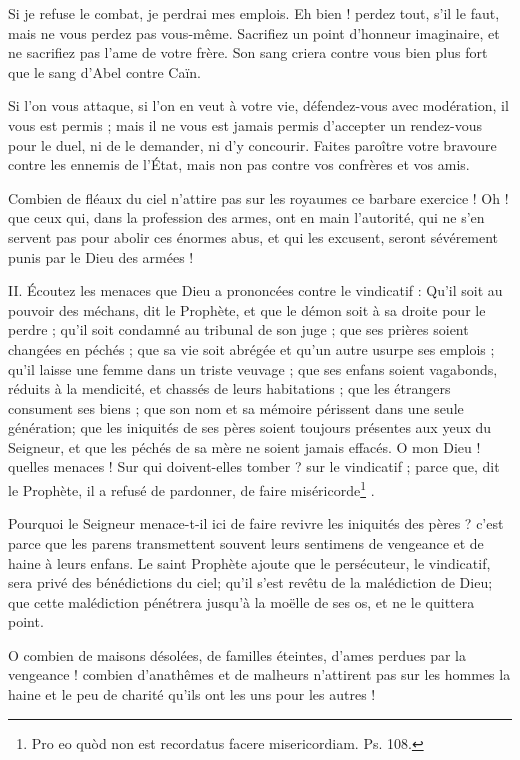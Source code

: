 \documentclass[instructions.tex]{subfiles}
\begin{document}
Si je refuse le combat, je perdrai mes emplois. Eh bien ! perdez tout, s’il le faut, mais ne vous perdez pas vous-même. Sacrifiez un point d’honneur imaginaire, et ne sacrifiez pas l’ame de votre frère. Son sang criera contre vous bien plus fort que le sang d’Abel contre Caïn.
 
Si l’on vous attaque, si l’on en veut à votre vie, défendez-vous avec modération, il vous est permis ; mais il ne vous est jamais permis d’accepter un rendez-vous pour le duel, ni de le demander, ni d’y concourir. Faites paroître votre bravoure contre les ennemis de l’État, mais non pas contre vos confrères et vos amis.
 
Combien de fléaux du ciel n’attire pas sur les royaumes ce barbare exercice ! Oh ! que ceux qui, dans la profession des armes, ont en main l’autorité, qui ne s’en servent pas pour abolir ces énormes abus, et qui les excusent, seront sévérement punis par le Dieu des armées !
 
II. Écoutez les menaces que Dieu a prononcées contre le vindicatif : Qu’il soit au pouvoir des méchans, dit le Prophète, et que le démon soit à sa droite pour le perdre ; qu’il soit condamné au tribunal de son juge ; que ses prières soient changées en péchés ; que sa vie soit abrégée et qu’un autre usurpe ses emplois ; qu’il laisse une femme dans un triste veuvage ; que ses enfans soient vagabonds, réduits à la mendicité, et chassés de leurs habitations ; que les étrangers consument ses biens ; que son nom et sa mémoire périssent dans une seule génération; que les iniquités de ses pères soient toujours présentes aux yeux du Seigneur, et que les péchés de sa mère ne soient jamais effacés. O mon Dieu ! quelles menaces ! Sur qui doivent-elles tomber ? sur le vindicatif ; parce que, dit le Prophète, il a refusé de pardonner, de faire miséricorde\footnote{Pro eo quòd non est recordatus facere misericordiam. Ps. 108.} .
 
Pourquoi le Seigneur menace-t-il ici de faire revivre les iniquités des pères ? c’est parce que les parens transmettent souvent leurs sentimens de vengeance et de haine à leurs enfans. Le saint Prophète ajoute que le persécuteur, le vindicatif, sera privé des bénédictions du ciel; qu’il s’est revêtu de la malédiction de Dieu; que cette malédiction pénétrera jusqu’à la moëlle de ses os, et ne le quittera point.
 
O combien de maisons désolées, de familles éteintes, d’ames perdues par la vengeance ! combien d’anathêmes et de malheurs n’attirent pas sur les hommes la haine et le peu de charité qu’ils ont les uns pour les autres !
 
\end{document}
